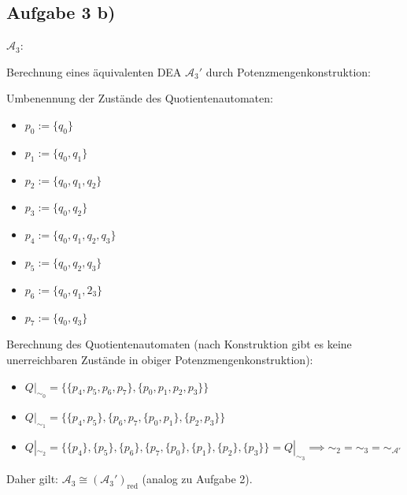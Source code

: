 \documentclass[12pt,a4paper]{article}
\newcommand{\A}{\mathcal{A}}
\begin{document}
\subsection*{Aufgabe 3 b)}
$\A_3$:\\
\usetikzlibrary{positioning,automata}

Berechnung eines äquivalenten DEA $\A_3'$ durch Potenzmengenkonstruktion:

Umbenennung der Zustände des Quotientenautomaten:
\begin{itemize}
	\item $p_0:=\lbrace q_0\rbrace$
	\item $p_1:=\lbrace q_0,q_1\rbrace$
	\item $p_2:=\lbrace q_0,q_1,q_2\rbrace$
	\item $p_3:=\lbrace q_0,q_2\rbrace$
	\item $p_4:=\lbrace q_0,q_1,q_2,q_3\rbrace$
	\item $p_5:=\lbrace q_0,q_2,q_3\rbrace$
	\item $p_6:=\lbrace q_0,q_1,2_3\rbrace$
	\item $p_7:=\lbrace q_0,q_3\rbrace$
\end{itemize}

Berechnung des Quotientenautomaten (nach Konstruktion gibt es keine unerreichbaren Zustände in obiger Potenzmengenkonstruktion):
\begin{itemize}
	\item $Q|_{\sim_0}=\big\lbrace\lbrace p_4,p_5,p_6,p_7\rbrace,\lbrace p_0,p_1,p_2,p_3\rbrace\big\rbrace$
	\item $Q|_{\sim_1}=\big\lbrace\lbrace p_4,p_5\rbrace,\lbrace p_6,p_7,\lbrace p_0,p_1\rbrace,\lbrace p_2,p_3\rbrace\big\rbrace$
	\item $Q|_{\sim_2}=\big\lbrace\lbrace p_4\rbrace,\lbrace p_5\rbrace,\lbrace p_6\rbrace,\lbrace p_7,\lbrace p_0\rbrace,\lbrace p_1\rbrace,\lbrace p_2\rbrace,\lbrace p_3\rbrace\big\rbrace=Q|_{\sim_3}\implies\sim_2=\sim_3=\sim_{\A'}$
\end{itemize}
Daher gilt: $\A_3\cong(\A_3')_{\text{red}}$ (analog zu Aufgabe 2).
\end{document}

